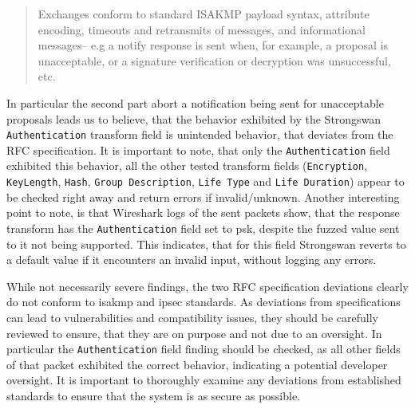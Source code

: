 \begin{quotation}
	Exchanges conform to standard ISAKMP payload syntax, attribute
	encoding, timeouts and retransmits of messages, and informational
	messages-- e.g a notify response is sent when, for example, a
	proposal is unacceptable, or a signature verification or decryption
	was unsuccessful, etc.
\end{quotation}

In particular the second part abort a notification being sent for unacceptable proposals leads us to believe, that the behavior exhibited by the Strongswan \texttt{Authentication} transform field is unintended behavior, that deviates from the RFC specification. It is important to note, that only the \texttt{Authentication} field exhibited this behavior, all the other tested transform fields (\texttt{Encryption}, \texttt{KeyLength}, \texttt{Hash}, \texttt{Group Description}, \texttt{Life Type} and \texttt{Life Duration}) appear to be checked right away and return errors if invalid/unknown. Another interesting point to note, is that Wireshark logs of the sent packets show, that the response transform has the \texttt{Authentication} field set to \ac{psk}, despite the fuzzed value sent to it not being supported. This indicates, that for this field Strongswan reverts to a default value if it encounters an invalid input, without logging any errors.

While not necessarily severe findings, the two RFC specification deviations clearly do not conform to \ac{isakmp} and \ac{ipsec} standards. As deviations from specifications can lead to vulnerabilities and compatibility issues, they should be carefully reviewed to ensure, that they are on purpose and not due to an oversight. In particular the \texttt{Authentication} field finding should be checked, as all other fields of that packet exhibited the correct behavior, indicating a potential developer oversight. It is important to thoroughly examine any deviations from established standards to ensure that the system is as secure as possible.


